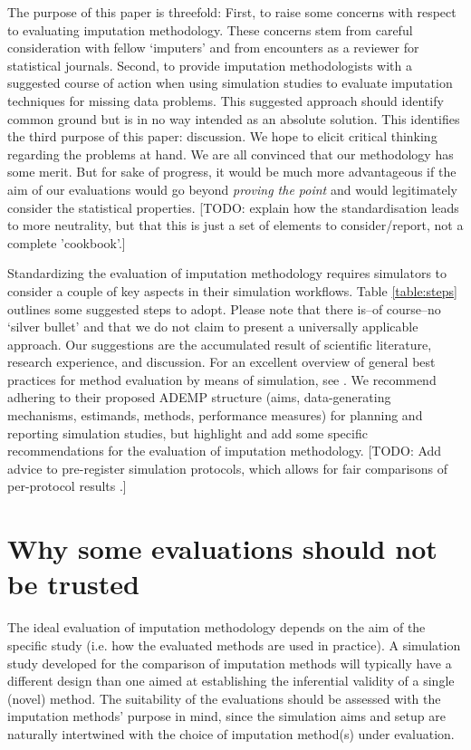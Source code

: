 \documentclass[bimj,fleqn]{w-art}
\begin{document}
The purpose of this paper is threefold: First, to raise some concerns with respect to evaluating imputation methodology. These concerns stem from careful consideration with fellow `imputers' and from encounters as a reviewer for statistical journals. Second, to provide imputation methodologists with a suggested course of action when using simulation studies to evaluate imputation techniques for missing data problems. This suggested approach should identify common ground but is in no way intended as an absolute solution. This identifies the third purpose of this paper: discussion. We hope to elicit critical thinking regarding the problems at hand. We are all convinced that our methodology has some merit. But for sake of progress, it would be much more advantageous if the aim of our evaluations would go beyond \textit{proving the point} and would legitimately consider the statistical properties. [TODO: explain how the standardisation leads to more neutrality, but that this is just a set of elements to consider/report, not a complete 'cookbook'.]

Standardizing the evaluation of imputation methodology requires simulators to consider a couple of key aspects in their simulation workflows. Table \ref{table:steps} outlines some suggested steps to adopt. Please note that there is--of course--no `silver bullet' and that we do not claim to present a universally applicable approach. Our suggestions are the accumulated result of scientific literature, research experience, and discussion. For an excellent overview of general best practices for method evaluation by means of simulation, see \citet{morr18}. We recommend adhering to their proposed ADEMP structure (aims, data-generating mechanisms, estimands, methods, performance measures) for planning and reporting simulation studies, but highlight and add some specific recommendations for the evaluation of imputation methodology. [TODO: Add advice to pre-register simulation protocols, which allows for fair comparisons of per-protocol results \citep{pawe22}.]


\section{Why some evaluations should not be trusted}


The ideal evaluation of imputation methodology depends on the aim of the specific study (i.e. how the evaluated methods are used in practice). A simulation study developed for the comparison of imputation methods will typically have a different design than one aimed at establishing the inferential validity of a single (novel) method. The suitability of the evaluations should be assessed with the imputation methods' purpose in mind, since the simulation aims and setup are naturally intertwined with the choice of imputation method(s) under evaluation.
\end{document}
